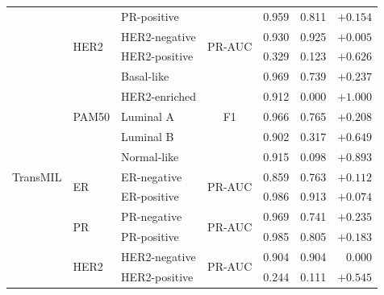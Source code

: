 \begin{table}[ht]
\begin{tabular}{lllcrrr}
    &  & PR-positive &  & 0.959 & 0.811 & $+0.154$ \\
    & \multirow{2}{*}{HER2} & HER2-negative & \multirow{2}{*}{PR-AUC} & 0.930 & 0.925 & $+0.005$ \\
    &  & HER2-positive &  & 0.329 & 0.123 & $+0.626$ \\
\midrule
   \multirow{11}{*}{TransMIL} & \multirow{5}{*}{PAM50} & Basal-like & \multirow{5}{*}{F1} & 0.969 & 0.739 & $+0.237$ \\
    &  & HER2-enriched &  & 0.912 & 0.000 & $+1.000$ \\
    &  & Luminal A &  & 0.966 & 0.765 & $+0.208$ \\
    &  & Luminal B &  & 0.902 & 0.317 & $+0.649$ \\
    &  & Normal-like &  & 0.915 & 0.098 & $+0.893$ \\
    & \multirow{2}{*}{ER} & ER-negative & \multirow{2}{*}{PR-AUC} & 0.859 & 0.763 & $+0.112$ \\
    &  & ER-positive &  & 0.986 & 0.913 & $+0.074$ \\
    & \multirow{2}{*}{PR} & PR-negative & \multirow{2}{*}{PR-AUC} & 0.969 & 0.741 & $+0.235$ \\
    &  & PR-positive &  & 0.985 & 0.805 & $+0.183$ \\
    & \multirow{2}{*}{HER2} & HER2-negative & \multirow{2}{*}{PR-AUC} & 0.904 & 0.904 & $0.000$ \\
    &  & HER2-positive &  & 0.244 & 0.111 & $+0.545$ \\
\bottomrule
\end{tabular}
\end{table}